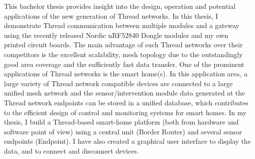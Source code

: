 This bachelor thesis provides insight into the design, operation and potential applications of the new generation of Thread networks. In this thesis, I demonstrate Thread communication between multiple modules and a gateway using the recently released Nordic nRF52840 Dongle modules and my own printed circuit boards. The main advantage of such Thread networks over their competitors is the excellent scalability, mesh topology due to the outstandingly good area coverage and the sufficiently fast data transfer. One of the prominent applications of Thread networks is the smart home(s). In this application area, a large variety of Thread network compatible devices are connected to a large unified mesh network and the sensor/intervention module data generated at the Thread network endpoints can be stored in a unified database, which contributes to the efficient design of control and monitoring systems for smart homes. In my thesis, I build a Thread-based smart-home platform (both from hardware and software point of view) using a central unit (Border Router) and several sensor endpoints (Endpoint). I have also created a graphical user interface to display the data, and to connect and disconnect devices.